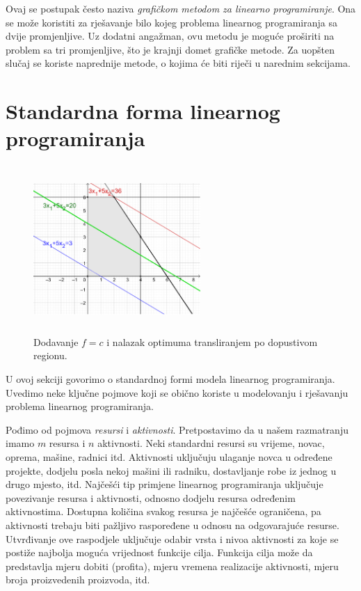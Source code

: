\documentclass[b5paper, utf8, 11pt, colorlinks]{book}
\theoremstyle{definition}
\begin{document}
Ovaj se postupak često naziva \emph{grafičkom metodom za linearno programiranje}. Ona se može koristiti za rješavanje bilo kojeg problema linearnog programiranja sa dvije promjenljive. Uz dodatni angažman,  ovu metodu je moguće   proširiti na problem sa tri promjenljive, što je krajnji domet grafičke metode. Za uopšten slučaj se koriste naprednije metode,  o kojima će biti riječi u narednim sekcijama.

\section{Standardna forma linearnog programiranja}

\begin{figure}[!ht]
    \centering
    \includegraphics[width=180pt, height=180pt]{fig2.eps}
    \caption{Dodavanje $f = c$ i nalazak optimuma transliranjem po dopustivom regionu.}
    \label{fig:fig2}
 \end{figure}

 U ovoj sekciji govorimo o standardnoj formi modela linearnog programiranja. Uvedimo neke ključne pojmove koji se obično koriste u modelovanju i rješavanju problema linearnog programiranja. 

 Pođimo od pojmova \textit{resursi} i \textit{aktivnosti}. Pretpostavimo da u našem razmatranju imamo $m$ resursa i $n$ aktivnosti. Neki standardni resursi su vrijeme, novac, oprema, mašine, radnici itd. Aktivnosti uključuju ulaganje novca u određene projekte, dodjelu posla nekoj mašini ili radniku,  dostavljanje robe iz jednog u drugo mjesto, itd. 
  Najčešći tip primjene linearnog programiranja uključuje povezivanje resursa i aktivnosti, odnosno dodjelu resursa određenim aktivnostima. Dostupna količina svakog resursa je najčešće ograničena, pa aktivnosti trebaju biti pažljivo raspoređene u odnosu na odgovarajuće resurse.  Utvrđivanje ove raspodjele uključuje odabir vrsta i nivoa aktivnosti za koje se postiže najbolja moguća vrijednost  funkcije cilja. Funkcija cilja može da predstavlja mjeru dobiti (profita), mjeru vremena realizacije aktivnosti, mjeru broja proizvedenih proizvoda, itd.
\end{document}
